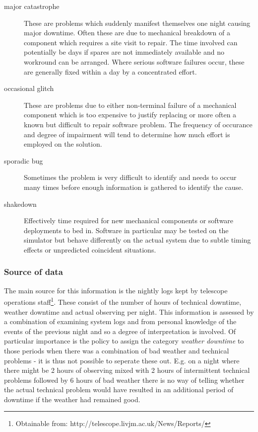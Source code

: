 \begin{description}
\item [major catastrophe] These are problems which suddenly manifest themselves one night causing major downtime. Often these are due to mechanical breakdown of a component which requires a site visit to repair. The time involved can potentially be days if spares are not immediately available and no workround can be arranged. Where serious software failures occur, these are generally fixed within a day by a concentrated effort.

\item [occasional glitch] These are problems due to either non-terminal failure of a mechanical component which is too expensive to justify replacing or more often a known but difficult to repair software problem. The frequency of occurance and degree of impairment will tend to determine how much effort is employed on the solution.

\item [sporadic bug] Sometimes the problem is very difficult to identify and needs to occur many times before enough information is gathered to identify the cause. 

\item [shakedown] Effectively time required for new mechanical components or software deployments to bed in. Software in particular may be tested on the simulator but behave differently on the actual system due to subtle timing effects or unpredicted coincident situations.
\end{description}


\subsubsection{Source of data}
The main source for this information is the nightly logs kept by telescope operations staff\footnote{Obtainable from: http://telescope.livjm.ac.uk/News/Reports/}. These consist of the number of hours of technical downtime, weather downtime and actual observing per night. This information is assessed by a combination of examining system logs and from personal knowledge of the events of the previous night and so a degree of interpretation is involved. Of particular importance is the policy to assign the category \emph{weather downtime} to those periods when there was a combination of bad weather and technical problems - it is thus not possible to seperate these out. E.g. on a night where there might be 2 hours of observing mixed with 2 hours of intermittent technical problems followed by 6 hours of bad weather there is no way of telling whether the actual technical problem would have resulted in an additional period of downtime if the weather had remained good. 

